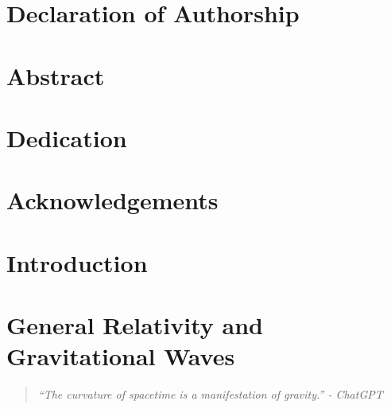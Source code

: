 \documentclass[12pt,twoside]{report} %
\newcommand{\chapterquote}[1]{
  \begin{quote}
    \color{mediumgray}\itshape #1
  \end{quote}
}
\begin{document}



\chapter*{}


\chapter*{Declaration of Authorship}


\chapter*{Abstract}


\chapter*{Dedication}


\chapter*{Acknowledgements}


\tableofcontents

\listoffigures

\listoftables

\cleardoublepage
{} 

\chapter*{Introduction}


\chapter[General Relativity and Gravitational Waves]{General Relativity and\\ Gravitational Waves}
\chapterquote{``The curvature of spacetime is a manifestation of gravity.'' - ChatGPT}

\end{document}
